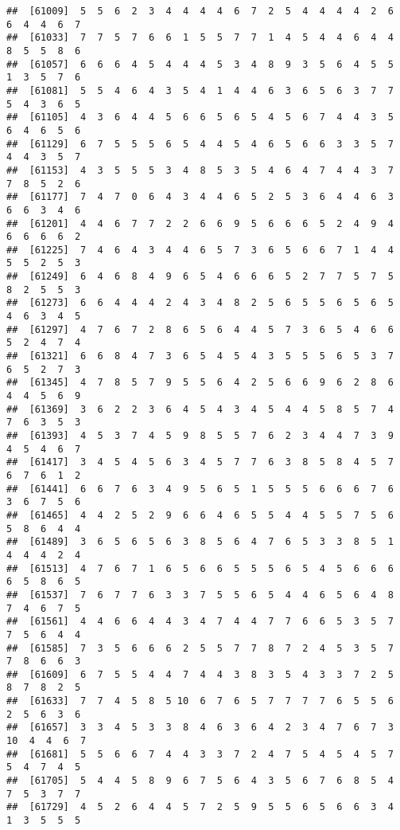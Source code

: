 \documentclass[
]{book}
\begin{document}
\begin{verbatim}
##  [61009]  5  5  6  2  3  4  4  4  4  6  7  2  5  4  4  4  4  2  6  6  4  4  6  7
##  [61033]  7  7  5  7  6  6  1  5  5  7  7  1  4  5  4  4  6  4  4  8  5  5  8  6
##  [61057]  6  6  6  4  5  4  4  4  5  3  4  8  9  3  5  6  4  5  5  1  3  5  7  6
##  [61081]  5  5  4  6  4  3  5  4  1  4  4  6  3  6  5  6  3  7  7  5  4  3  6  5
##  [61105]  4  3  6  4  4  5  6  6  5  6  5  4  5  6  7  4  4  3  5  6  4  6  5  6
##  [61129]  6  7  5  5  5  6  5  4  4  5  4  6  5  6  6  3  3  5  7  4  4  3  5  7
##  [61153]  4  3  5  5  5  3  4  8  5  3  5  4  6  4  7  4  4  3  7  7  8  5  2  6
##  [61177]  7  4  7  0  6  4  3  4  4  6  5  2  5  3  6  4  4  6  3  6  6  3  4  6
##  [61201]  4  4  6  7  7  2  2  6  6  9  5  6  6  6  5  2  4  9  4  6  6  6  6  2
##  [61225]  7  4  6  4  3  4  4  6  5  7  3  6  5  6  6  7  1  4  4  5  5  2  5  3
##  [61249]  6  4  6  8  4  9  6  5  4  6  6  6  5  2  7  7  5  7  5  8  2  5  5  3
##  [61273]  6  6  4  4  4  2  4  3  4  8  2  5  6  5  5  6  5  6  5  4  6  3  4  5
##  [61297]  4  7  6  7  2  8  6  5  6  4  4  5  7  3  6  5  4  6  6  5  2  4  7  4
##  [61321]  6  6  8  4  7  3  6  5  4  5  4  3  5  5  5  6  5  3  7  6  5  2  7  3
##  [61345]  4  7  8  5  7  9  5  5  6  4  2  5  6  6  9  6  2  8  6  4  4  5  6  9
##  [61369]  3  6  2  2  3  6  4  5  4  3  4  5  4  4  5  8  5  7  4  7  6  3  5  3
##  [61393]  4  5  3  7  4  5  9  8  5  5  7  6  2  3  4  4  7  3  9  4  5  4  6  7
##  [61417]  3  4  5  4  5  6  3  4  5  7  7  6  3  8  5  8  4  5  7  6  7  6  1  2
##  [61441]  6  6  7  6  3  4  9  5  6  5  1  5  5  5  6  6  6  7  6  3  6  7  5  6
##  [61465]  4  4  2  5  2  9  6  6  4  6  5  5  4  4  5  5  7  5  6  5  8  6  4  4
##  [61489]  3  6  5  6  5  6  3  8  5  6  4  7  6  5  3  3  8  5  1  4  4  4  2  4
##  [61513]  4  7  6  7  1  6  5  6  6  5  5  5  6  5  4  5  6  6  6  6  5  8  6  5
##  [61537]  7  6  7  7  6  3  3  7  5  5  6  5  4  4  6  5  6  4  8  7  4  6  7  5
##  [61561]  4  4  6  6  4  4  3  4  7  4  4  7  7  6  6  5  3  5  7  7  5  6  4  4
##  [61585]  7  3  5  6  6  6  2  5  5  7  7  8  7  2  4  5  3  5  7  7  8  6  6  3
##  [61609]  6  7  5  5  4  4  7  4  4  3  8  3  5  4  3  3  7  2  5  8  7  8  2  5
##  [61633]  7  7  4  5  8  5 10  6  7  6  5  7  7  7  7  6  5  5  6  2  5  6  3  6
##  [61657]  3  3  4  5  3  3  8  4  6  3  6  4  2  3  4  7  6  7  3 10  4  4  6  7
##  [61681]  5  5  6  6  7  4  4  3  3  7  2  4  7  5  4  5  4  5  7  5  4  7  4  5
##  [61705]  5  4  4  5  8  9  6  7  5  6  4  3  5  6  7  6  8  5  4  7  5  3  7  7
##  [61729]  4  5  2  6  4  4  5  7  2  5  9  5  5  6  5  6  6  3  4  1  3  5  5  5

\end{verbatim}
\end{document}
